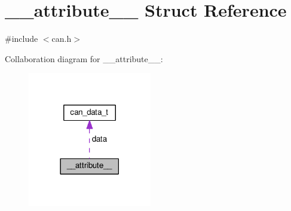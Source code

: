 \hypertarget{struct____attribute____}{}\section{\+\_\+\+\_\+attribute\+\_\+\+\_\+ Struct Reference}
\label{struct____attribute____}


{\ttfamily \#include $<$can.\+h$>$}



Collaboration diagram for \+\_\+\+\_\+attribute\+\_\+\+\_\+\+:\nopagebreak
\begin{figure}[H]
\begin{center}
\leavevmode
\includegraphics[width=153pt]{dd/d0e/struct____attribute______coll__graph}
\end{center}
\end{figure}
